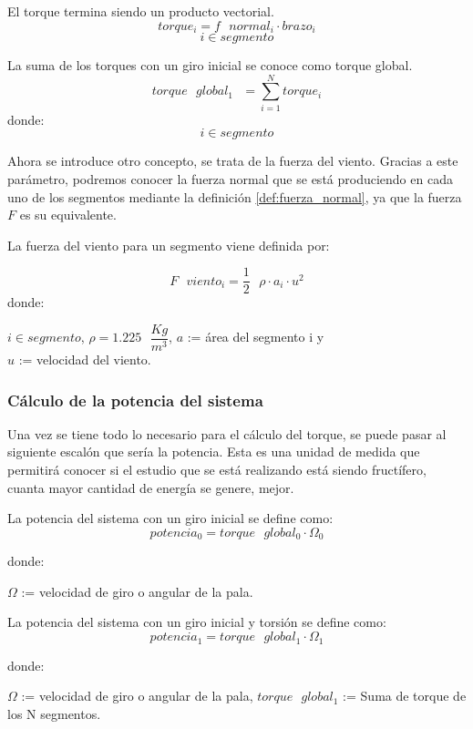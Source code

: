   \begin{definicion}
  El torque termina siendo un producto vectorial.
 $$ torque_i = f \text{ } normal_i \cdot brazo_i$$
 $$ i \in segmento$$
 \label{def:torque_vectorial}
 \end{definicion}
 
\begin{definicion}
 La suma de los torques con un giro inicial se conoce como torque global.
 $$ torque \text{ } global_1 \text{ } = \sum_{i=1}^{N} torque_i $$
 donde:
 $$ i \in segmento$$
 \label{def:torque_global}
\end{definicion}


 Ahora se introduce otro concepto, se trata de la fuerza del viento. Gracias a este parámetro, podremos conocer la fuerza normal que se está produciendo en cada uno de los segmentos mediante la definición \ref{def:fuerza_normal}, ya que la fuerza $F$ es su equivalente.
 
 \begin{definicion}
 La fuerza del viento para un segmento viene definida por:
 
 $$ F \text{ } viento_i = \dfrac{1}{2} \text{ } \rho \cdot a_i \cdot u^2$$
 donde:
 
  \centering $i \in segmento$,  $\rho = 1.225 \text{ } \dfrac{Kg}{m^3}$, $a$ := área del segmento i y \\ $u$ := velocidad del viento.
 \label{def:fuerza_viento}
 \end{definicion}
 
 
 \subsubsection{Cálculo de la potencia del sistema}
 
 Una vez se tiene todo lo necesario para el cálculo del torque, se puede pasar al siguiente escalón que sería la potencia. Esta es una unidad de medida que permitirá conocer si el estudio que se está realizando está siendo fructífero, cuanta mayor cantidad de energía se genere, mejor.
 
  \begin{definicion}
 La potencia del sistema con un giro inicial se define como:
 $$ potencia_0 = torque \text{ } global_0 \cdot \Omega_0 $$ 
 
 donde:
 
  \centering $\Omega$ := velocidad de giro o angular de la pala.
 \label{def:potencia_giro_inicial}
 \end{definicion}
 
   \begin{definicion}
 La potencia del sistema con un giro inicial y torsión se define como:
 $$ potencia_1 = torque \text{ } global_1 \cdot \Omega_1 $$ 
 
 donde:
 
  \centering $\Omega$ := velocidad de giro o angular de la pala, $torque \text{ } global_1$ := Suma de torque de los N segmentos.
 \label{def:potencia_giro_segmentos}
 \end{definicion}